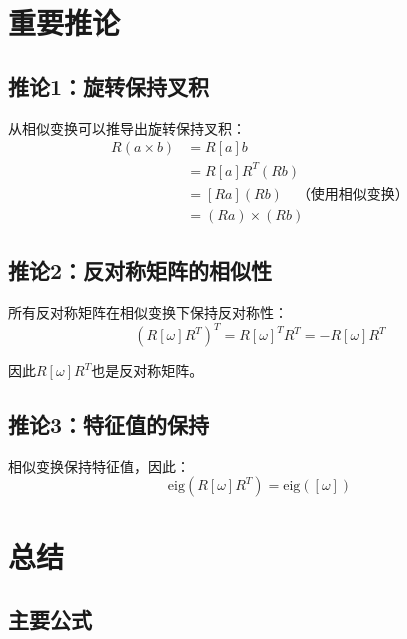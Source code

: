 \documentclass[12pt,a4paper]{article}
\begin{document}
\section{重要推论}

\subsection{推论1：旋转保持叉积}

从相似变换可以推导出旋转保持叉积：
\begin{align}
R(a \times b) &= R [a] b \\
&= R [a] R^T (R b) \\
&= [R a] (R b) \quad \text{（使用相似变换）} \\
&= (R a) \times (R b)
\end{align}

\subsection{推论2：反对称矩阵的相似性}

所有反对称矩阵在相似变换下保持反对称性：
\begin{equation}
(R [\omega] R^T)^T = R [\omega]^T R^T = -R [\omega] R^T
\end{equation}

因此$R [\omega] R^T$也是反对称矩阵。

\subsection{推论3：特征值的保持}

相似变换保持特征值，因此：
\begin{equation}
\text{eig}(R [\omega] R^T) = \text{eig}([\omega])
\end{equation}

\section{总结}

\subsection{主要公式}
\end{document}
